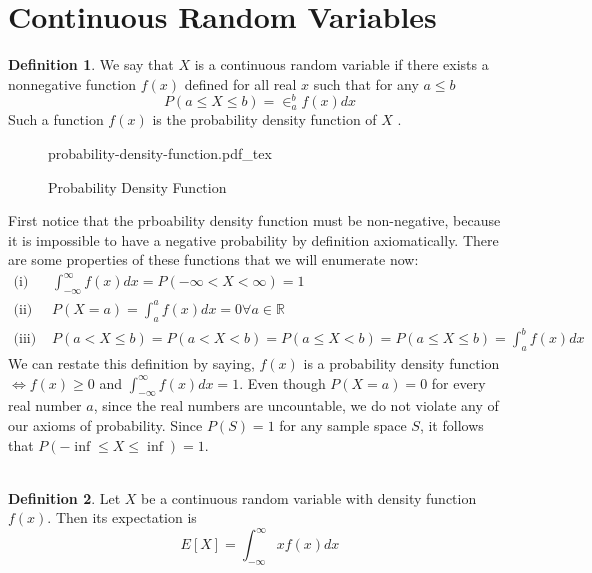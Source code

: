\documentclass{article}
\newcommand{\incfig}[1]{%
    \def\svgwidth{\columnwidth}
    {#1.pdf_tex}
}
\theoremstyle{definition}
\newtheorem{definition}{Definition}[section]
\begin{document}
\section{Continuous Random Variables}
    \begin{mdframed}
        \begin{definition}
            We say that $X$ is a continuous random variable if there exists a 
            nonnegative function $f(x)$ defined for all real $x$ such that for any $a \leq b$
            \[
                P(a \leq X \leq b) = \in_a^bf(x)dx
            \]
            Such a function $f(x)$ is the probability density function of $X$ .
        \end{definition}
    \end{mdframed}
    \begin{figure}[ht]
        \centering
        \incfig{probability-density-function}
        \caption{Probability Density Function}
        \label{fig:probability-density-function}
    \end{figure}
    First notice that the prboability density function must be non-negative, because it is impossible
    to have a negative probability by definition axiomatically. There are some properties of these functions that we will
    enumerate now:
    \begin{align*}
        \text{(i) } & \int_{-\infty}^\infty f(x)dx = P(-\infty < X < \infty ) = 1 \\
        \text{(ii) } & P(X = a) = \int_a^a f(x)dx = 0 \forall a \in \mathbb{R} \\
        \text{(iii) } & P(a < X \leq b) = P(a < X < b) = P(a \leq X < b) = P(a \leq X \leq b) = \int_a^bf(x)dx
    \end{align*}
    We can restate this definition by saying, $f(x)$ is a probability density function
    $\Leftrightarrow f(x) \geq 0$ and $\int_{-\infty}^\infty f(x)dx = 1$.
    Even though $P(X = a) = 0$ for every real number $a$, since the real numbers are uncountable,
    we do not violate any of our axioms of probability. Since $P(S) = 1$ for any sample space $S$,
    it follows that $P(-\inf \leq X \leq \inf) = 1$.\\\\
    \begin{mdframed}
        \begin{definition}
            Let $X$ be a continuous random variable with density function $f(x)$. Then its expectation is
            \[
                E[X] = \int_{-\infty}^\infty x f(x) dx
            \]
        \end{definition}
    \end{mdframed}
\end{document}
